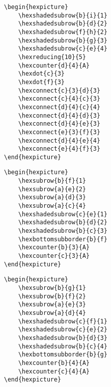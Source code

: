\documentclass[a4paper,12pt]{article}
\begin{document}
    \begin{verbatim}\begin{hexpicture}
    \hexshadedsubrow{b}{i}{1}
    \hexshadedsubrow{b}{d}{2}
    \hexshadedsubrow{f}{h}{2}
    \hexshadedsubrow{b}{g}{3}
    \hexshadedsubrow{c}{e}{4}
    \hexreducing{10}{5}
    \hexcounter{d}{4}{A}
    \hexdot{c}{3}
    \hexdot{f}{3}
    \hexconnect{c}{3}{d}{3}
    \hexconnect{c}{4}{c}{3}
    \hexconnect{d}{4}{c}{4}
    \hexconnect{d}{4}{d}{3}
    \hexconnect{d}{4}{e}{3}
    \hexconnect{e}{3}{f}{3}
    \hexconnect{d}{4}{e}{4}
    \hexconnect{e}{4}{f}{3}
\end{hexpicture}\end{verbatim}

    \begin{hexpicture}
    \end{hexpicture}

    \begin{verbatim}\begin{hexpicture}
    \hexsubrow{b}{f}{1}
    \hexsubrow{a}{e}{2}
    \hexsubrow{a}{d}{3}
    \hexsubrow{a}{c}{4}
    \hexshadedsubrow{c}{e}{1}
    \hexshadedsubrow{b}{d}{2}
    \hexshadedsubrow{b}{c}{3}
    \hexbottomsubborder{b}{f}
    \hexcounter{b}{3}{A}
    \hexcounter{c}{3}{A}
\end{hexpicture}\end{verbatim}

    \begin{hexpicture}
    \end{hexpicture}

    \begin{verbatim}\begin{hexpicture}
    \hexsubrow{b}{g}{1}
    \hexsubrow{b}{f}{2}
    \hexsubrow{a}{e}{3}
    \hexsubrow{a}{d}{4}
    \hexshadedsubrow{c}{f}{1}
    \hexshadedsubrow{c}{e}{2}
    \hexshadedsubrow{b}{d}{3}
    \hexshadedsubrow{b}{c}{4}
    \hexbottomsubborder{b}{g}
    \hexcounter{b}{4}{A}
    \hexcounter{c}{4}{A}
\end{hexpicture}\end{verbatim}
\end{document}
